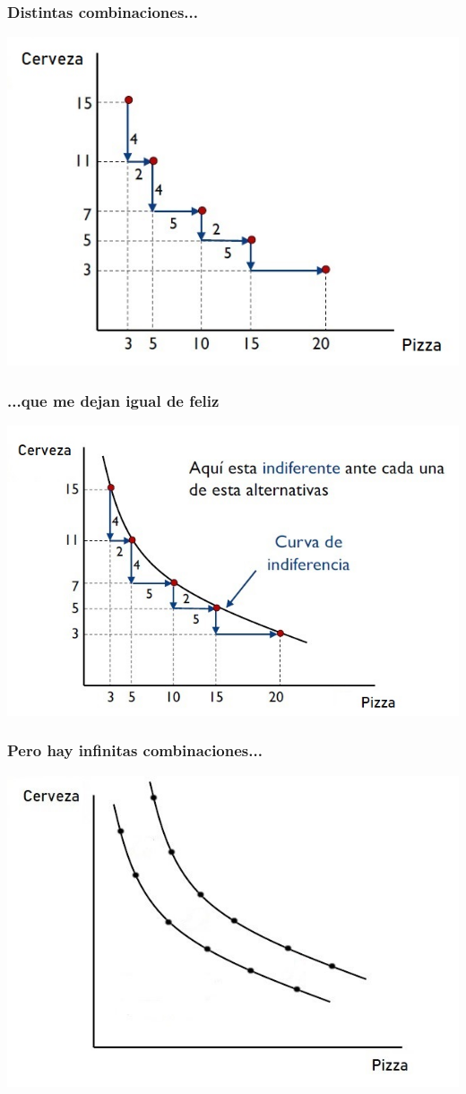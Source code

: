 \documentclass{beamer}
\begin{document}
\begin{frame}
\frametitle{ Distintas combinaciones...}
\centering
\includegraphics[scale=0.6]{Figures/Tema_02.12_rp10.jpg}
\end{frame}

\begin{frame}
\frametitle{ ...que me dejan igual de feliz}
\centering
\includegraphics[scale=0.6]{Figures/Tema_02.13_rp11.jpg}
\end{frame}

\begin{frame}
\frametitle{Pero hay infinitas combinaciones...}
\centering
\includegraphics[scale=0.6]{Figures/Tema_02.15_rp12.jpg}
\end{frame}
\end{document}
